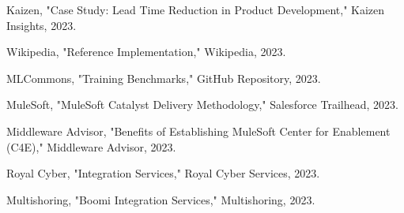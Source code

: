 \documentclass[11pt,a4paper]{article}
\begin{document}
\begin{thebibliography}{99}
 Kaizen, "Case Study: Lead Time Reduction in Product Development," Kaizen Insights, 2023.

 Wikipedia, "Reference Implementation," Wikipedia, 2023.

 MLCommons, "Training Benchmarks," GitHub Repository, 2023.

 MuleSoft, "MuleSoft Catalyst Delivery Methodology," Salesforce Trailhead, 2023.

 Middleware Advisor, "Benefits of Establishing MuleSoft Center for Enablement (C4E)," Middleware Advisor, 2023.

 Royal Cyber, "Integration Services," Royal Cyber Services, 2023.

 Multishoring, "Boomi Integration Services," Multishoring, 2023.

\end{thebibliography}



\end{document}
